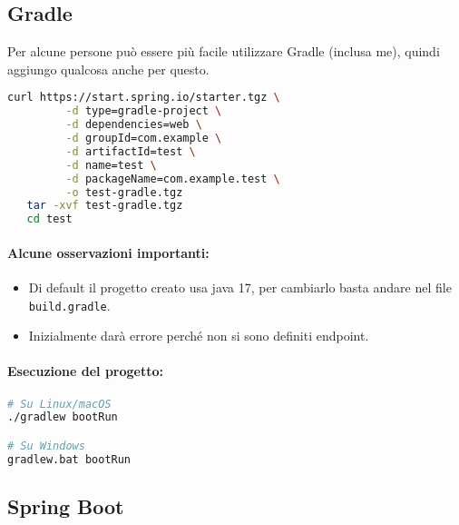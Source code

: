 \subsection{Gradle}

Per alcune persone può essere più facile utilizzare Gradle (inclusa me), quindi aggiungo qualcosa anche per questo.



\begin{lstlisting}[language=bash, caption={Creazione di un progetto Spring Boot con Gradle}]
curl https://start.spring.io/starter.tgz \
         -d type=gradle-project \
         -d dependencies=web \
         -d groupId=com.example \
         -d artifactId=test \
         -d name=test \
         -d packageName=com.example.test \
         -o test-gradle.tgz
   tar -xvf test-gradle.tgz
   cd test
\end{lstlisting}

\paragraph{Alcune osservazioni importanti:}

\begin{itemize}
	\item Di default il progetto creato usa java 17, per cambiarlo basta andare nel file \texttt{build.gradle}.
	\item Inizialmente darà errore perché non si sono definiti endpoint.
\end{itemize}

\paragraph{Esecuzione del progetto:}

\begin{lstlisting}[language=bash, caption={Avvio del progetto Spring Boot con Gradle}]
# Su Linux/macOS
./gradlew bootRun

# Su Windows
gradlew.bat bootRun
\end{lstlisting}


\subsection{Spring Boot}







